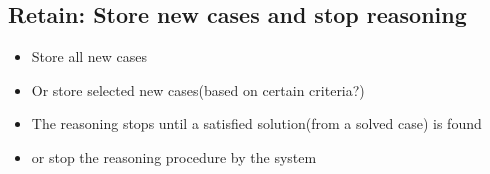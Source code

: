 \subsection{Retain: Store new cases and stop reasoning}
\begin{itemize}
\item Store all new cases
\item Or store selected new cases(based on certain criteria?)
\item The reasoning stops until a satisfied solution(from a solved case) is found
\item or stop the reasoning procedure by the system
\end{itemize}
